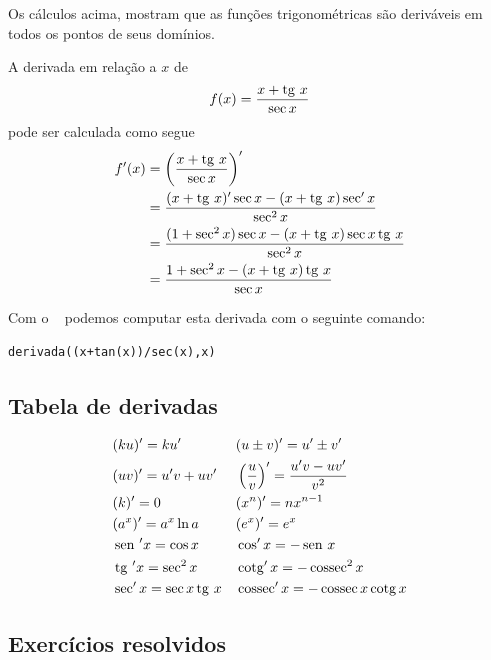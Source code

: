 \cleardoublepage\documentclass[../main.tex]{subfiles}
\begin{document}
\begin{obs}
  Os cálculos acima, mostram que as funções trigonométricas são deriváveis em todos os pontos de seus domínios.
\end{obs}

\begin{ex}
  A derivada em relação a $x$ de
  \begin{equation*}
    f(x) = \frac{x + \operatorname{tg}\, x}{\sec x}
  \end{equation*}
  pode ser calculada como segue
  \begin{align*}
    f'(x) &= \left(\frac{x+\operatorname{tg}\, x}{\sec x}\right)' \\
          &= \frac{(x+\operatorname{tg}\, x)'\sec x - (x+\operatorname{tg}\, x)\sec' x}{\sec^2 x} \\
          &= \frac{(1+\sec^2 x)\sec x - (x+\operatorname{tg}\, x)\sec x\operatorname{tg}\, x}{\sec^2 x} \\
          &= \frac{1+\sec^2 x - (x+\operatorname{tg}\, x)\operatorname{tg}\, x}{\sec x}
  \end{align*}

  
  Com o \geogebra~ podemos computar esta derivada com o seguinte comando:
\begin{verbatim}
derivada((x+tan(x))/sec(x),x)
\end{verbatim}

\end{ex}

\subsection{Tabela de derivadas}

\begin{align*}
  & (ku)' = ku' && (u\pm v)' = u' \pm v'\\
  & (uv)' = u'v + uv' && \left(\frac{u}{v}\right)' = \frac{u'v - uv'}{v^2} \\
  & (k)' = 0 && (x^n)' = nx^{n-1}\\
  & (a^x)' = a^x\ln a && (e^x)' = e^x \\
  & \operatorname{sen}\,' x = \cos x && \cos' x = - \operatorname{sen}\, x\\
  & \operatorname{tg}\,' x = \sec^2 x && \operatorname{cotg}' x = -\operatorname{cossec}^2 x \\
  & \sec' x = \sec x \operatorname{tg}\, x && \operatorname{cossec}' x = -\operatorname{cossec} x\operatorname{cotg} x
\end{align*}

\subsection{Exercícios resolvidos}
\end{document}
